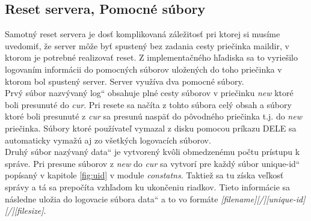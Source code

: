 \documentclass[11pt,a4paper]{article}
\providecommand{\uv}[1]{\quotedblbase #1\textquotedblleft}
\begin{document}
	\subsection{Reset servera, Pomocné súbory}
		\indent Samotný reset servera je dosť komplikovaná záležitosť pri ktorej si musíme uvedomiť, že server môže byť spustený bez zadania cesty priečinka maildir, v ktorom je potrebné realizovať reset. Z implementačného hľadiska sa to vyriešilo logovaním informácii do pomocných súborov uložených do toho priečinka v ktorom bol spustený server. Server využíva dva pomocné súbory.\\[0.4em]
		\indent Prvý súbor nazvývaný \uv{log} obsahuje plné cesty súborov v priečinku \textit{new} ktoré boli presunuté do \textit{cur}. Pri resete sa načíta z tohto súbora celý obsah a súbory ktoré boli presunuté z \textit{cur} sa presunú naspäť do pôvodného priečinka t.j. do \textit{new} priečinka. Súbory ktoré používateľ vymazal z disku pomocou príkazu DELE sa automaticky vymažú aj zo všetkých logovacích súborov.\\[0.4em]
		\indent Druhý súbor nazývaný \uv{data} je vytvorený kvôli obmedzenému počtu prístupu k správe. Pri presune súborov z \textit{new} do \textit{cur} sa vytvorí pre každý súbor \uv{unique-id} popísaný v kapitole \ref{fig:uid} v module \textit{constatns}. Taktiež sa tu získa veľkosť správy a tá sa prepočíta vzhľadom ku ukončeniu riadkov. Tieto informácie sa následne uložia do logovacie súbora \uv{data} a to vo formáte \textit{[filename][/][unique-id][/][filesize]}.
\end{document}
